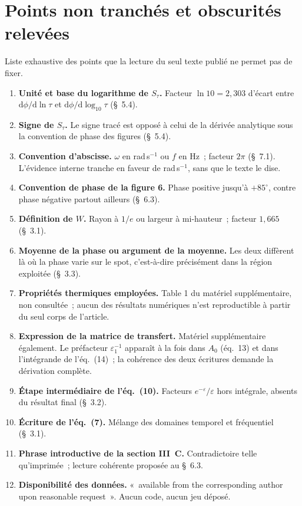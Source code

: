 \documentclass[11pt,a4paper]{article}
\begin{document}
\section{Points non tranchés et obscurités relevées}

Liste exhaustive des points que la lecture du seul texte publié ne permet pas de fixer.

\begin{enumerate}[leftmargin=1.7em,itemsep=3pt,topsep=2pt]
\item \textbf{Unité et base du logarithme de $S_\tau$.} Facteur $\ln 10 = 2{,}303$ d'écart entre
      $\mathrm{d}\phi/\mathrm{d}\ln\tau$ et $\mathrm{d}\phi/\mathrm{d}\log_{10}\tau$ (§~5.4).
\item \textbf{Signe de $S_\tau$.} Le signe tracé est opposé à celui de la dérivée analytique
      sous la convention de phase des figures (§~5.4).
\item \textbf{Convention d'abscisse.} $\omega$ en rad\,s$^{-1}$ ou $f$ en Hz~; facteur $2\pi$
      (§~7.1). L'évidence interne tranche en faveur de rad\,s$^{-1}$, sans que le texte le dise.
\item \textbf{Convention de phase de la figure 6.} Phase positive jusqu'à $+85^\circ$, contre
      phase négative partout ailleurs (§~6.3).
\item \textbf{Définition de $W$.} Rayon à $1/e$ ou largeur à mi-hauteur~; facteur $1{,}665$
      (§~3.1).
\item \textbf{Moyenne de la phase ou argument de la moyenne.} Les deux diffèrent là où la phase
      varie sur le spot, c'est-à-dire précisément dans la région exploitée (§~3.3).
\item \textbf{Propriétés thermiques employées.} Table 1 du matériel supplémentaire, non
      consultée~; aucun des résultats numériques n'est reproductible à partir du seul corps de
      l'article.
\item \textbf{Expression de la matrice de transfert.} Matériel supplémentaire également. Le
      préfacteur $\varepsilon_1^{-1}$ apparaît à la fois dans $A_0$ (éq.~13) et dans l'intégrande
      de l'éq.~(14)~; la cohérence des deux écritures demande la dérivation complète.
\item \textbf{Étape intermédiaire de l'éq.~(10).} Facteurs $e^{-\varepsilon}/\varepsilon$ hors
      intégrale, absents du résultat final (§~3.2).
\item \textbf{Écriture de l'éq.~(7).} Mélange des domaines temporel et fréquentiel (§~3.1).
\item \textbf{Phrase introductive de la section III~C.} Contradictoire telle qu'imprimée~;
      lecture cohérente proposée au §~6.3.
\item \textbf{Disponibilité des données.} «~available from the corresponding author upon
      reasonable request~». Aucun code, aucun jeu déposé.
\end{enumerate}
\end{document}
